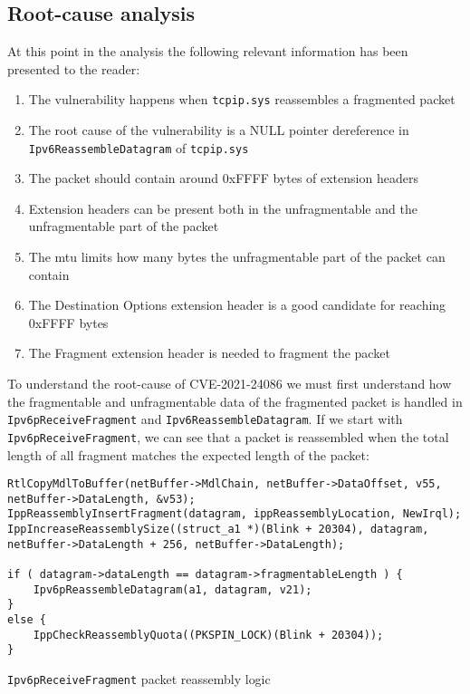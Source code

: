 \documentclass{report}
\begin{document}
\subsection{Root-cause analysis}
\label{sec:CVE-2021-24086:root-cause}
At this point in the analysis the following relevant information has been presented to the reader:
\begin{enumerate}
    \item The vulnerability happens when \texttt{tcpip.sys} reassembles a fragmented packet
    \item The root cause of the vulnerability is a NULL pointer dereference in \texttt{Ipv6ReassembleDatagram} of \texttt{tcpip.sys}
    \item The packet should contain around 0xFFFF bytes of extension headers
    \item Extension headers can be present both in the unfragmentable and the unfragmentable part of the packet
    \item The \gls{mtu} limits how many bytes the unfragmentable part of the packet can contain
    \item The Destination Options extension header is a good candidate for reaching 0xFFFF bytes
    \item The Fragment extension header is needed to fragment the packet
\end{enumerate}

To understand the root-cause of CVE-2021-24086 we must first understand how the fragmentable and unfragmentable data of the fragmented packet is handled in \texttt{Ipv6pReceiveFragment} and \texttt{Ipv6ReassembleDatagram}. If we start with \texttt{Ipv6pReceiveFragment}, we can see that a packet is reassembled when the total length of all fragment matches the expected length of the packet:

\begin{listing}[H]
\begin{verbatim}
RtlCopyMdlToBuffer(netBuffer->MdlChain, netBuffer->DataOffset, v55, netBuffer->DataLength, &v53);
IppReassemblyInsertFragment(datagram, ippReassemblyLocation, NewIrql);
IppIncreaseReassemblySize((struct_a1 *)(Blink + 20304), datagram, netBuffer->DataLength + 256, netBuffer->DataLength);

if ( datagram->dataLength == datagram->fragmentableLength ) {
    Ipv6pReassembleDatagram(a1, datagram, v21);
}
else {
    IppCheckReassemblyQuota((PKSPIN_LOCK)(Blink + 20304));
}
\end{verbatim}
\caption{\texttt{Ipv6pReceiveFragment} packet reassembly logic}
\label{listing:Ipv6pReceiveFragment:check}
\end{listing}
\end{document}

